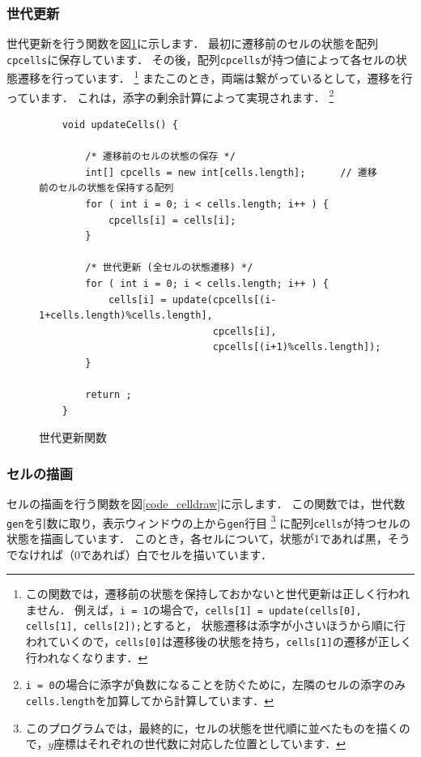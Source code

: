 \documentclass[dvipdfmx]{jsarticle}
\theoremstyle{definition}
\begin{document}
\subsubsection{世代更新}

世代更新を行う関数を図\ref{code_cellupdate}に示します．
最初に遷移前のセルの状態を配列\verb|cpcells|に保存しています．
その後，配列\verb|cpcells|が持つ値によって各セルの状態遷移を行っています．
\footnote{
    この関数では，遷移前の状態を保持しておかないと世代更新は正しく行われません．
    例えば，\texttt{i = 1}の場合で，\texttt{cells[1] = update(cells[0], cells[1], cells[2]);}とすると，
    状態遷移は添字が小さいほうから順に行われていくので，\texttt{cells[0]}は遷移後の状態を持ち，\texttt{cells[1]}の遷移が正しく行われなくなります．
}
またこのとき，両端は繋がっているとして，遷移を行っています．
これは，添字の剰余計算によって実現されます．
\footnote{
    \texttt{i = 0}の場合に添字が負数になることを防ぐために，左隣のセルの添字のみ\texttt{cells.length}を加算してから計算しています．
}

\begin{figure}[ht]
\begin{center}
\begin{oframed}
\footnotesize
\begin{verbatim}
    void updateCells() {

        /* 遷移前のセルの状態の保存 */
        int[] cpcells = new int[cells.length];      // 遷移前のセルの状態を保持する配列
        for ( int i = 0; i < cells.length; i++ ) {
            cpcells[i] = cells[i];
        }

        /* 世代更新 (全セルの状態遷移) */
        for ( int i = 0; i < cells.length; i++ ) {
            cells[i] = update(cpcells[(i-1+cells.length)%cells.length],
                              cpcells[i],
                              cpcells[(i+1)%cells.length]);
        }

        return ;
    }
\end{verbatim}
\end{oframed}
\end{center}
\caption{世代更新関数}
\label{code_cellupdate}
\end{figure}


\subsubsection{セルの描画}

セルの描画を行う関数を図\ref{code_celldraw}に示します．
この関数では，世代数\verb|gen|を引数に取り，表示ウィンドウの上から\verb|gen|行目
\footnote{
    このプログラムでは，最終的に，セルの状態を世代順に並べたものを描くので，$y$座標はそれぞれの世代数に対応した位置としています．
}
に配列\verb|cells|が持つセルの状態を描画しています．
このとき，各セルについて，状態が1であれば黒，そうでなければ（0であれば）白でセルを描いています．
\end{document}
